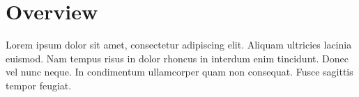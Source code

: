 \section{Overview}

Lorem ipsum dolor sit amet, consectetur adipiscing elit. Aliquam ultricies lacinia euismod. Nam tempus risus in dolor rhoncus in interdum enim tincidunt. Donec vel nunc neque. In condimentum ullamcorper quam non consequat. Fusce sagittis tempor feugiat. 

\par\vspace{0.5cm}
\noindent {}\\
